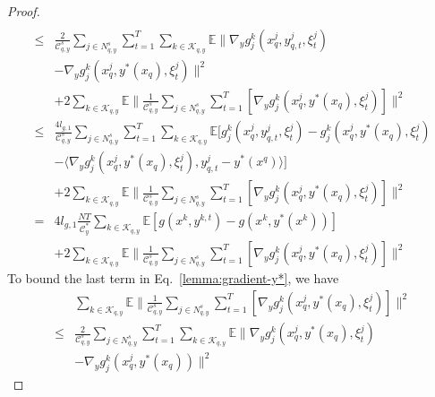 \documentclass[lettersize,journal]{IEEEtran}
\begin{document}
\begin{proof}
\begin{align}
    \\
    \leq& \frac{2}{\mathcal{C}^{s}_{q,y}}\sum_{j\in N^{s}_{q,y}}\sum_{t=1}^T\sum_{k\in \mathcal{K}_{q,y}}\mathbb{E}\|\nabla_y g^k_j(x_{q}^j,y_{q,t}^j,\xi_t^j)\nonumber\\
    &-\nabla_y g^k_j(x_{q}^j,y^*(x_{q}),\xi_t^j)\|^2\nonumber\\
    &+2\sum_{k\in \mathcal{K}_{q,y}}\mathbb{E}\|\frac{1}{\mathcal{C}^{s}_{q,y}}\sum_{j\in N^{s}_{q,y}}\sum_{t=1}^T\left[\nabla_y g^k_j(x_{q}^j,y^*(x_{q}),\xi_t^j)\right]\|^2
    \nonumber
    \\
    \leq& \frac{4l_{g,1}}{\mathcal{C}^{s}_{q,y}}\sum_{j\in N^{s}_{q,y}}\sum_{t=1}^T\sum_{k\in \mathcal{K}_{q,y}}\mathbb{E}[g^k_j(x_{q}^j,y_{q,t}^j,\xi_t^j)-g^k_j(x_{q}^j,y^*(x_{q}),\xi_t^j)\nonumber\\
    &-\langle \nabla_y g^k_j(x_{q}^j,y^*(x_{q}),\xi_t^j),y_{q,t}^j-y^{*}(x^q)\rangle]
    \nonumber
    \\
    &+2\sum_{k\in \mathcal{K}_{q,y}}\mathbb{E}\|\frac{1}{\mathcal{C}^{s}_{q,y}}\sum_{j\in N^{s}_{q,y}}\sum_{t=1}^T[\nabla_y g^k_j(x_{q}^j,y^*(x_{q}),\xi_t^j)]\|^2
    \nonumber
    \\=&4l_{g,1}\frac{NT}{\mathcal{C}^{*}_{y}}\sum_{k\in \mathcal{K}_{q,y}}\mathbb{E}\left[g\left(x^k,y^{k,t}\right)-g\left(x^k,y^*(x^k)\right)\right]\label{lemma:gradient-y*}\\
    &+2\sum_{k\in \mathcal{K}_{q,y}}\mathbb{E}\|\frac{1}{\mathcal{C}^{s}_{q,y}}\sum_{j\in N^{s}_{q,y}}\sum_{t=1}^T[\nabla_y g^k_j(x_{q}^j,y^*(x_{q}),\xi_t^j)]\|^2\nonumber
\end{align}
To bound the last term in Eq.~\ref{lemma:gradient-y*}, we have
\begin{align}
    &\sum_{k\in \mathcal{K}_{q,y}}\mathbb{E}\|\frac{1}{\mathcal{C}^{s}_{q,y}}\sum_{j\in N^{s}_{q,y}}\sum_{t=1}^T\left[\nabla_y g^k_j(x_{q}^j,y^*(x_{q}),\xi_t^j)\right]\|^2
    \nonumber
    \\
    \leq&\frac{2}{\mathcal{C}^{s}_{q,y}}\sum_{j\in N^{s}_{q,y}}\sum_{t=1}^T\sum_{k\in \mathcal{K}_{q,y}}\mathbb{E}\|\nabla_y g^k_j(x_{q}^j,y^*(x_{q}),\xi_t^j)\nonumber\\&-\nabla_y g^k_j(x_{q}^j,y^*(x_{q}))\|^2

\end{align}
\end{proof}
\end{document}
